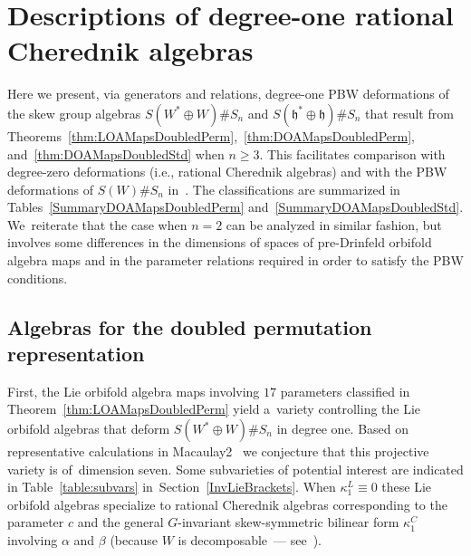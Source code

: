 \documentclass[10pt,a4paper]{amsart}
\numberwithin{equation}{section}
\begin{document}
\section{Descriptions of degree-one rational Cherednik algebras}\label{Deg1RCAs}


Here we present, via generators and relations, degree-one PBW deformations
of the skew group algebras $S(W^* \oplus W) \# S_n$ and $S(\mathfrak{h}^* \oplus \mathfrak{h})\# S_n$
that result from Theorems~\ref{thm:LOAMapsDoubledPerm},~\ref{thm:DOAMapsDoubledPerm},
and~\ref{thm:DOAMapsDoubledStd} when \mbox{$n \geq 3$}. This facilitates comparison with degree-zero
deformations (i.e., rational Cherednik algebras) and with the PBW deformations of
$S(W)\# S_n$ in~\cite{FGK}. The classifications are summarized in
Tables~\ref{SummaryDOAMapsDoubledPerm} and~\ref{SummaryDOAMapsDoubledStd}. We~reiterate that the case when $n=2$ can be analyzed in similar fashion, but involves
some differences in the dimensions of spaces of pre-Drinfeld
orbifold algebra maps and in the parameter relations required in order to satisfy the
PBW conditions.

\subsection{Algebras for the doubled permutation representation}\label{AlgsDoubledPermRep}

First, the Lie orbifold algebra maps involving $17$ parameters classified in
Theorem~\ref{thm:LOAMapsDoubledPerm} yield a~variety controlling
the Lie orbifold algebras that deform $S(W^* \oplus W) \# S_n$ in degree one.
Based on representative calculations in Macaulay2~\cite{M2} we conjecture
that this projective variety is of~dimension seven. Some subvarieties of potential
interest are indicated in Table~\ref{table:subvars} in~Section~\ref{InvLieBrackets}.
When $\kappa^L_1 \equiv 0$ these Lie orbifold algebras
specialize to rational Cherednik algebras corresponding to the parameter $c$ and the general
$G$-invariant skew-symmetric bilinear form $\kappa^C_1$ involving $\alpha$ and $\beta$
(because $W$ is decomposable~--- see~\cite[proof of Theorem 1.3]{EtingofGinzburg2002}).
\end{document}
